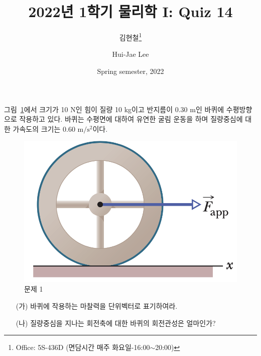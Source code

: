 \documentclass[floatfix,nofootinbib,superscriptaddress,fleqn]{revtex4-2}
\begin{document}
\title{\Large 2022년 1학기 물리학 I: Quiz 14}
\author{김현철\footnote{Office: 5S-436D (면담시간 매주
    화요일-16:00$\sim$20:00)}} 
\author{Hui-Jae Lee} 
\date{Spring semester, 2022}

\vspace{1.cm}

\maketitle

그림~\ref{fig:1}에서 크기가 10 N인 힘이 질량 10 kg이고 반지름이 0.30
m인 바퀴에 수평방향으로 작용하고 있다. 바퀴는 수평면에 대하여 유연한
굴림 운동을 하며 질량중심에 대한 가속도의 크기는 0.60
$\mathrm{m/s^2}$이다. 
\begin{figure}[htp]
  \centering
\includegraphics[scale=0.5]{Qfig14-1-20220427.png}
  \caption{문제 1}
  \label{fig:1}
\end{figure}
\begin{itemize}
\item[(가)] 바퀴에 작용하는 마찰력을 단위벡터로 표기하여라.
\item[(나)] 질량중심을 지나는 회전축에 대한 바퀴의 회전관성은
  얼마인가?   
\end{itemize}
\end{document}
